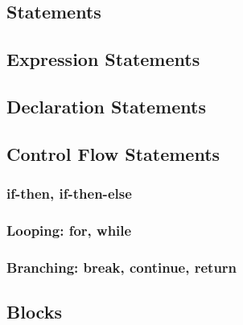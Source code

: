 \begin{homeworkProblem}
	\chapter{Statements}
	\section{Expression Statements}
	\section{Declaration Statements}
	\section{Control Flow Statements}
	\subsection{if-then, if-then-else}
	\subsection{Looping: for, while}
	\subsection{Branching: break, continue, return}
	\section{Blocks}
\end{homeworkProblem}
